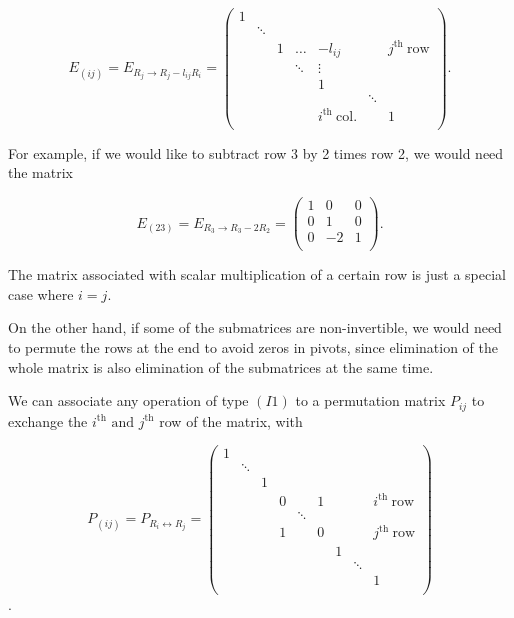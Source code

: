 \documentclass[a4paper,12pt]{report}
\begin{document}
\begin{equation}
    E_{(ij)} = E_{R_{j} \rightarrow R_{j}-l_{ij}  R_{i}   } = \begin{pmatrix}
        1 &  &  &  &  &  &   \\
         & \ddots  &  &  &  &  &   \\
         &  & 1 & \ldots  & -l_{ij}  &  & j^{\text{th }}\text{row}   \\
         &  &  & \ddots  & \vdots  &  &   \\
         &  &  &  & 1 &  &   \\
         &  &  &  &  & \ddots  &   \\
         &  &  &  & i^{\text{th }}\text{col.}  &  & 1  \\
    \end{pmatrix}.
\end{equation}

For example, if we would like to subtract row 3 by 2 times row 2, we would need the matrix 

\begin{equation}
    E_{(23)} = E_{R_{3} \to R_{3} - 2R_{2}   } = \begin{pmatrix}
        1 & 0 &  0 \\
        0 & 1 &  0 \\
        0 & -2 & 1  \\
    \end{pmatrix}.
\end{equation}

The matrix associated with scalar multiplication of a certain row is just a special case where \(i = j\).

On the other hand, if some of the submatrices are non-invertible, we would need to permute the rows at the end to avoid zeros in pivots, since elimination of the whole matrix is also elimination of the submatrices at the same time. 

We can associate any operation of type \((I1)\) to a permutation matrix \(P_{ij} \) to exchange the \(i^{\text{th}} \text { and } j^{\text{th}} \) row of the matrix, with 

\begin{equation}
    P_{(ij)} =  P_{R_{i} \leftrightarrow R_{j}  } = \begin{pmatrix}
        1 &  &  &  &  &  &  &  &   \\
         & \ddots  &  &  &  &  &  &  &   \\
         &  & 1 &  &  &  &  &  &   \\
         &  &  & 0 &  & 1 &  &  & i^{\text{th }}\text{row}    \\
         &  &  &  & \ddots  &  &  &  &   \\
         &  &  & 1 &  & 0 &  &  & j^{\text{th }}\text{row}   \\
         &  &  &  &  &  & 1 &  &   \\
         &  &  &  &  &  &  & \ddots  &   \\
         &  &  &  &  &  &  &  &  1 \\
    \end{pmatrix}
\end{equation}. 
\end{document}
